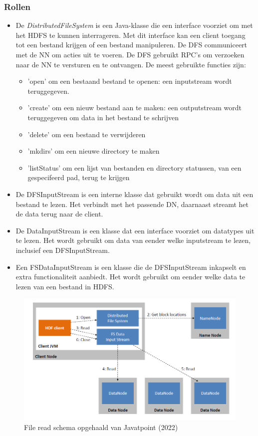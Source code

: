 \documentclass[a4paper,10pt,twoside]{report}
\begin{document}
\subsubsection{Rollen}

\begin{itemize}
	\item De \textit{DistributedFileSystem} is een Java-klasse die een interface voorziet om met het HDFS te kunnen interrageren. Met dit interface kan een client toegang tot een bestand krijgen of een bestand manipuleren. De DFS communiceert met de NN om acties uit te voeren. De DFS gebruikt RPC's om verzoeken naar de NN te versturen en te ontvangen. De meest gebruikte functies zijn: 
	\begin{itemize}
		\item 'open' om een bestaand bestand te openen: een inputstream wordt teruggegeven.
		\item 'create' om een nieuw bestand aan te maken: een outputstream wordt teruggegeven om data in het bestand te schrijven
		\item 'delete' om een bestand te verwijderen
		\item 'mkdirs' om een nieuwe directory te maken
		\item 'listStatus' om een lijst van bestanden en directory statussen, van een gespecifeerd pad, terug te krijgen
	\end{itemize}
	\item De DFSInputStream is een interne klasse dat gebruikt wordt om data uit een bestand te lezen. Het verbindt met het passende DN, daarnaast streamt het de data terug naar de client.
	\item De DataInputStream is een klasse dat een interface voorziet om datatypes uit te lezen. Het wordt gebruikt om data van eender welke inputstream te lezen, inclusief een DFSInputStream.
	\item Een FSDataInputStream is een klasse die de DFSInputStream inkapselt en extra functionaliteit aanbiedt. Het wordt gebruikt om eender welke data te lezen van een bestand in HDFS.
\end{itemize}


\begin{figure}
	\includegraphics[width=\linewidth]{images/HDFS-Read.png}
	\caption{File read schema opgehaald van Javatpoint (2022)}
\end{figure}
\end{document}
